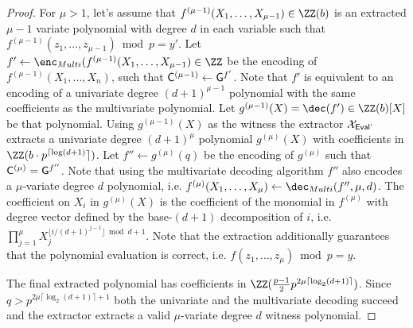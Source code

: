 \begin{proof}
For $\mu>1$, let's assume that $f^{(\mu-1)}(X_1,\dots,X_{\mu-1})\in \ZZ(b)$ is an extracted $\mu-1$ variate polynomial with degree $d$ in each variable such that $f^{(\mu-1)}(z_1,\dots,z_{\mu-1}) \bmod p=y'$.
Let $f'\gets \enc_{Multi}(f^{(\mu-1)}(X_1,\dots,X_{\mu-1})\in \ZZ$ be the encoding of $f^{(\mu-1)}(X_1,\dots,X_n)$, such that $\gr{C}^{(\mu-1)}\gets \gr{g}^{f'}$. Note that $f'$ is equivalent to an encoding of a univariate degree $(d+1)^{\mu-1}$ polynomial with the same coefficients as the multivariate polynomial. Let $g^{(\mu-1)}(X)=\dec(f')\in \ZZ(b)[X]$ be that polynomial. 
Using $g^{(\mu-1)}(X)$ as the witness the extractor $\mathcal{X}_{\textsf{{Eval'}}}$ extracts a univariate degree $(d+1)^{\mu}$ polynomial $g^{(\mu)}(X)$ with coefficients in $\ZZ(b \cdot p^{\lceil\log(d+1)}\rceil)$. 
Let $f''\gets g^{(\mu)}(q)$ be the encoding of $g^{(\mu)}$ such that $\gr{C}^{(\mu)}=\gr{g}^{f''}$. Note that using the multivariate decoding algorithm $f''$ also encodes a $\mu$-variate degree $d$ polynomial, i.e. $f^{(\mu)}(X_1,\dots,X_\mu)\gets \dec_{Multi}(f'',\mu,d)$. The coefficient on $X_i$ in $g^{(\mu)}(X)$ is the coefficient of the monomial in $f^{(\mu)}$ with degree vector defined by the base-$(d+1)$ decomposition of $i$, i.e. $\prod_{j=1}^\mu  X_j^{\lfloor i/(d+1)^{j-1}\rfloor \bmod d+1 }$. Note that the extraction additionally guarantees that the polynomial evaluation is correct, i.e. $f(z_1,\dots,z_\mu)\bmod p=y$.

The final extracted polynomial has coefficients in $\ZZ(\frac{p-1}{2}p^{2\mu \lceil\log_2(d+1)\rceil})$. Since $q>p^{2\mu\lceil\log_2(d+1)\rceil+1}$ both the univariate and the multivariate decoding succeed and the extractor extracts a valid $\mu$-variate degree $d$ witness polynomial.
\end{proof}
